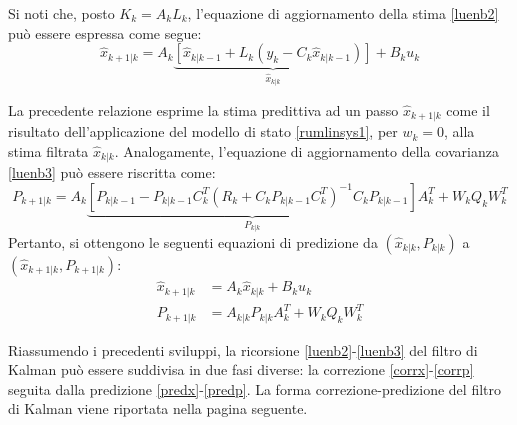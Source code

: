 Si noti che, posto $K_k=A_kL_k $, l’equazione di aggiornamento della stima \eqref{luenb2} può essere espressa come segue:
\begin{equation}
\hat{x}_{k+1|k}=A_k\underbrace{[\hat{x}_{k|k-1}+L_k(y_k-C_k\hat{x}_{k|k-1})]}_{\hat{x}_{k|k}}+B_ku_k
\end{equation}

La precedente relazione esprime la stima predittiva ad un passo $\hat{x}_{k+1|k} $ come il risultato dell’applicazione del modello di stato \eqref{rumlinsys1}, per $w_k=0 $, alla stima filtrata $\hat{x}_{k|k}$.
Analogamente, l’equazione di aggiornamento della covarianza \eqref{luenb3} può essere riscritta come:
\begin{equation}
P_{k+1|k}=A_k\underbrace{[P_{k|k-1}-P_{k|k-1}C_k^T(R_k+C_kP_{k|k-1}C_k^T)^{-1}C_kP_{k|k-1}]}_{P_{k|k}}A_k^T+W_kQ_kW_k^T
\end{equation}
Pertanto, si ottengono le seguenti equazioni di predizione da $(\hat{x}_{k|k},P_{k|k})$ a $(\hat{x}_{k+1|k},P_{k+1|k})$:
\begin{align}
\label{predx}
\hat{x}_{k+1|k}&=A_k\hat{x}_{k|k}+B_ku_k\\
\label{predp}
P_{k+1|k}&=A_{k|k}P_{k|k}A_k^T+W_kQ_kW_k^T
\end{align}

Riassumendo i precedenti sviluppi, la ricorsione \eqref{luenb2}-\eqref{luenb3} del filtro di Kalman può essere suddivisa in due fasi diverse: la correzione \eqref{corrx}-\eqref{corrp} seguita dalla predizione \eqref{predx}-\eqref{predp}. La forma correzione-predizione del filtro di Kalman viene riportata nella pagina seguente.
\newpage

